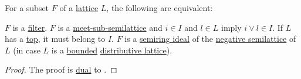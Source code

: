 \begin{proposition}\label{thm:lattice_filters}
  For a subset \( F \) of a \hyperref[def:lattice]{lattice} \( L \), the following are equivalent:
  \begin{thmenum}
     \( F \) is a \hyperref[def:order_ideal_and_filter]{filter}.
     \( F \) is a \hyperref[def:semilattice/submodel]{meet-sub-semilattice} and \( i \in I \) and \( l \in L \) imply \( i \vee l \in I \). If \( L \) has a \hyperref[def:partially_ordered_set_extremal_points/top_and_bottom]{top}, it must belong to \( I \).
     \( F \) is a \hyperref[def:semiring_ideal]{semiring ideal} of the \hyperref[ex:def:semiring/lattice]{negative semilattice} of \( L \) (in case \( L \) is a \hyperref[def:semilattice/bounded]{bounded} \hyperref[def:semilattice/distributive_lattice]{distributive lattice}).
  \end{thmenum}
\end{proposition}
\begin{proof}
  The proof is \hyperref[def:semilattice/duality]{dual} to .
\end{proof}
